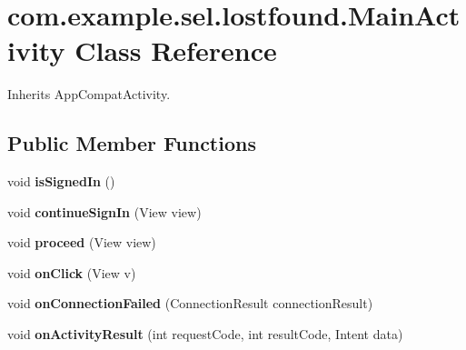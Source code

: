 \hypertarget{classcom_1_1example_1_1sel_1_1lostfound_1_1MainActivity}{\section{com.\-example.\-sel.\-lostfound.\-Main\-Activity \-Class \-Reference}
\label{classcom_1_1example_1_1sel_1_1lostfound_1_1MainActivity}
}


\-Inherits \-App\-Compat\-Activity.

\subsection*{\-Public \-Member \-Functions}
\begin{DoxyCompactItemize}
\item 
\hypertarget{classcom_1_1example_1_1sel_1_1lostfound_1_1MainActivity_a55b436bf176e21d22abf837dc8f2602c}{void {\bfseries is\-Signed\-In} ()}\label{classcom_1_1example_1_1sel_1_1lostfound_1_1MainActivity_a55b436bf176e21d22abf837dc8f2602c}

\item 
\hypertarget{classcom_1_1example_1_1sel_1_1lostfound_1_1MainActivity_af6914b0175f989ccb1c616f05a162f1a}{void {\bfseries continue\-Sign\-In} (\-View view)}\label{classcom_1_1example_1_1sel_1_1lostfound_1_1MainActivity_af6914b0175f989ccb1c616f05a162f1a}

\item 
\hypertarget{classcom_1_1example_1_1sel_1_1lostfound_1_1MainActivity_a4618c5d451d4e0c2ce4562499a583ee5}{void {\bfseries proceed} (\-View view)}\label{classcom_1_1example_1_1sel_1_1lostfound_1_1MainActivity_a4618c5d451d4e0c2ce4562499a583ee5}

\item 
\hypertarget{classcom_1_1example_1_1sel_1_1lostfound_1_1MainActivity_ac979afc8333ca7e81e7859cd383c614d}{void {\bfseries on\-Click} (\-View v)}\label{classcom_1_1example_1_1sel_1_1lostfound_1_1MainActivity_ac979afc8333ca7e81e7859cd383c614d}

\item 
\hypertarget{classcom_1_1example_1_1sel_1_1lostfound_1_1MainActivity_a15df38b4157a1f3a7c9dd7c8099e7495}{void {\bfseries on\-Connection\-Failed} (\-Connection\-Result connection\-Result)}\label{classcom_1_1example_1_1sel_1_1lostfound_1_1MainActivity_a15df38b4157a1f3a7c9dd7c8099e7495}

\item 
\hypertarget{classcom_1_1example_1_1sel_1_1lostfound_1_1MainActivity_ad934ef9a9347dc67bcaf5365213f58da}{void {\bfseries on\-Activity\-Result} (int request\-Code, int result\-Code, \-Intent data)}\label{classcom_1_1example_1_1sel_1_1lostfound_1_1MainActivity_ad934ef9a9347dc67bcaf5365213f58da}

\end{DoxyCompactItemize}

